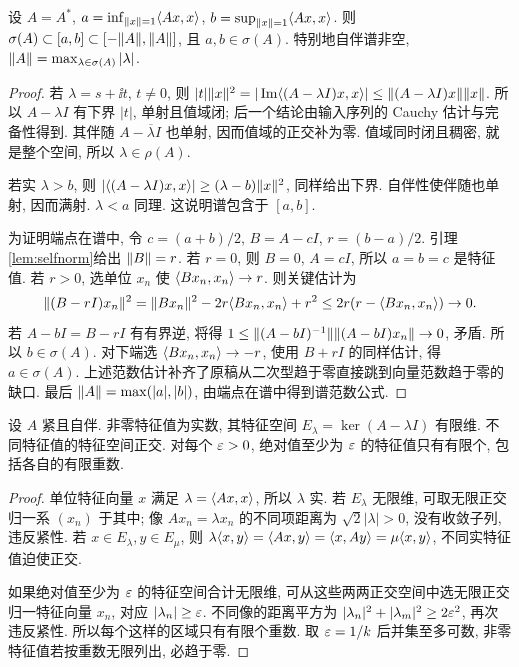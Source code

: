 \begin{theorem}\label{thm:selfspec}
设 $A=A^*$, $a=\inf_{\lVert x\rVert=1}\langle Ax,x\rangle$, $b=\sup_{\lVert x\rVert=1}\langle Ax,x\rangle$. 则 $\sigma(A)\subset[a,b]\subset[-\lVert A\rVert,\lVert A\rVert]$, 且 $a,b\in\sigma(A)$. 特别地自伴谱非空, $\lVert A\rVert=\max_{\lambda\in\sigma(A)}|\lambda|$.
\end{theorem}
\begin{proof}
若 $\lambda=s+\ii t$, $t\ne0$, 则
$|t|\lVert x\rVert^2=|\operatorname{Im}\langle (A-\lambda I)x,x\rangle|\le\lVert (A-\lambda I)x\rVert\lVert x\rVert$.
所以 $A-\lambda I$ 有下界 $|t|$, 单射且值域闭; 后一个结论由输入序列的 Cauchy 估计与完备性得到. 其伴随 $A-\overline\lambda I$ 也单射, 因而值域的正交补为零. 值域同时闭且稠密, 就是整个空间, 所以 $\lambda\in\rho(A)$.

若实 $\lambda>b$, 则 $|\langle (A-\lambda I)x,x\rangle|\ge(\lambda-b)\lVert x\rVert^2$, 同样给出下界. 自伴性使伴随也单射, 因而满射. $\lambda<a$ 同理. 这说明谱包含于 $[a,b]$.

为证明端点在谱中, 令 $c=(a+b)/2$, $B=A-cI$, $r=(b-a)/2$. 引理\ref{lem:selfnorm}给出 $\lVert B\rVert=r$. 若 $r=0$, 则 $B=0$, $A=cI$, 所以 $a=b=c$ 是特征值. 若 $r>0$, 选单位 $x_n$ 使 $\langle Bx_n,x_n\rangle\to r$. 则关键估计为
\[
\lVert (B-rI)x_n\rVert^2
=\lVert Bx_n\rVert^2-2r\langle Bx_n,x_n\rangle+r^2
\le2r(r-\langle Bx_n,x_n\rangle)\to0.
\]
若 $A-bI=B-rI$ 有有界逆, 将得 $1\le\lVert (A-bI)^{-1}\rVert\lVert (A-bI)x_n\rVert\to0$, 矛盾. 所以 $b\in\sigma(A)$. 对下端选 $\langle Bx_n,x_n\rangle\to-r$, 使用 $B+rI$ 的同样估计, 得 $a\in\sigma(A)$. 上述范数估计补齐了原稿从二次型趋于零直接跳到向量范数趋于零的缺口. 最后 $\lVert A\rVert=\max(|a|,|b|)$, 由端点在谱中得到谱范数公式.
\end{proof}

\begin{theorem}\label{thm:compact-eigen}
设 $A$ 紧且自伴. 非零特征值为实数, 其特征空间 $E_\lambda=\ker(A-\lambda I)$ 有限维. 不同特征值的特征空间正交. 对每个 $\varepsilon>0$, 绝对值至少为 $\varepsilon$ 的特征值只有有限个, 包括各自的有限重数.
\end{theorem}
\begin{proof}
单位特征向量 $x$ 满足 $\lambda=\langle Ax,x\rangle$, 所以 $\lambda$ 实. 若 $E_\lambda$ 无限维, 可取无限正交归一系 $(x_n)$ 于其中; 像 $Ax_n=\lambda x_n$ 的不同项距离为 $\sqrt2|\lambda|>0$, 没有收敛子列, 违反紧性. 若 $x\in E_\lambda,y\in E_\mu$, 则
$\lambda\langle x,y\rangle=\langle Ax,y\rangle=\langle x,Ay\rangle=\mu\langle x,y\rangle$, 不同实特征值迫使正交.

如果绝对值至少为 $\varepsilon$ 的特征空间合计无限维, 可从这些两两正交空间中选无限正交归一特征向量 $x_n$, 对应 $|\lambda_n|\ge\varepsilon$. 不同像的距离平方为 $|\lambda_n|^2+|\lambda_m|^2\ge2\varepsilon^2$, 再次违反紧性. 所以每个这样的区域只有有限个重数. 取 $\varepsilon=1/k$ 后并集至多可数, 非零特征值若按重数无限列出, 必趋于零.
\end{proof}

